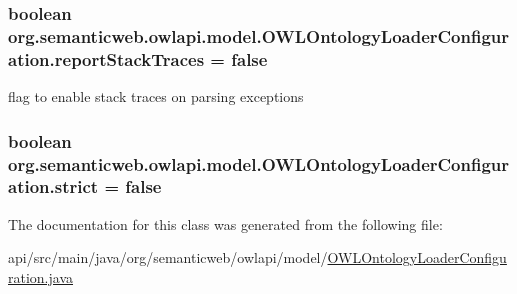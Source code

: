 \hypertarget{classorg_1_1semanticweb_1_1owlapi_1_1model_1_1_o_w_l_ontology_loader_configuration_af2df0eb7f91708fc967171570ca1ae91}{
\subsubsection[{report\-Stack\-Traces}]{\setlength{\rightskip}{0pt plus 5cm}boolean org.\-semanticweb.\-owlapi.\-model.\-O\-W\-L\-Ontology\-Loader\-Configuration.\-report\-Stack\-Traces = false\hspace{0.3cm}{\ttfamily [private]}}}\label{classorg_1_1semanticweb_1_1owlapi_1_1model_1_1_o_w_l_ontology_loader_configuration_af2df0eb7f91708fc967171570ca1ae91}
flag to enable stack traces on parsing exceptions \hypertarget{classorg_1_1semanticweb_1_1owlapi_1_1model_1_1_o_w_l_ontology_loader_configuration_ac8f2deb760c66c3d3bf620074b74e05b}{
\subsubsection[{strict}]{\setlength{\rightskip}{0pt plus 5cm}boolean org.\-semanticweb.\-owlapi.\-model.\-O\-W\-L\-Ontology\-Loader\-Configuration.\-strict = false\hspace{0.3cm}{\ttfamily [private]}}}\label{classorg_1_1semanticweb_1_1owlapi_1_1model_1_1_o_w_l_ontology_loader_configuration_ac8f2deb760c66c3d3bf620074b74e05b}


The documentation for this class was generated from the following file\-:\begin{DoxyCompactItemize}
\item 
api/src/main/java/org/semanticweb/owlapi/model/\hyperlink{_o_w_l_ontology_loader_configuration_8java}{O\-W\-L\-Ontology\-Loader\-Configuration.\-java}\end{DoxyCompactItemize}
